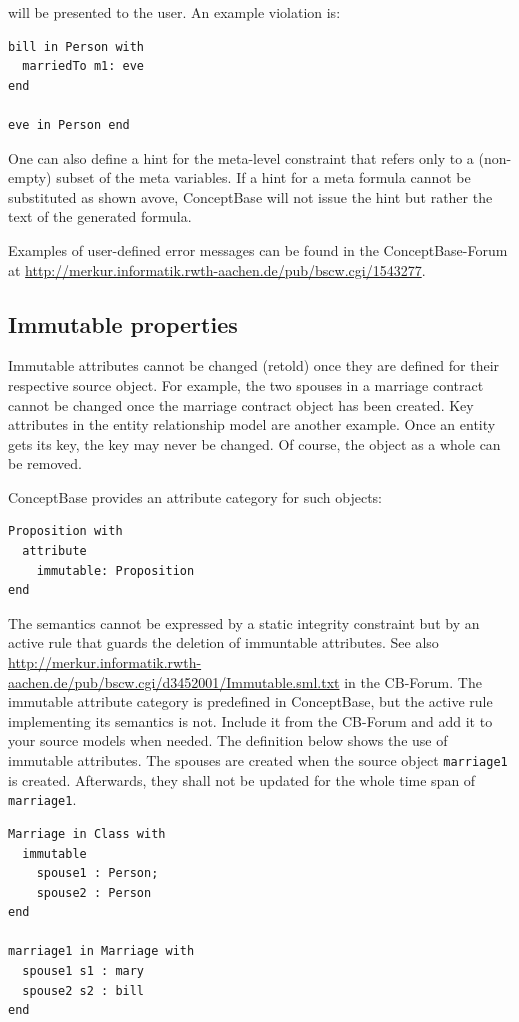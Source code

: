 will be presented to the user. An example violation is:

{\small
\begin{verbatim}
bill in Person with
  marriedTo m1: eve
end

eve in Person end
\end{verbatim}
}

One can also define a hint for the meta-level constraint that
refers only to a (non-empty) subset of the meta variables.
If a hint for a meta formula cannot be substituted as shown avove,
ConceptBase will not issue the hint but rather the text of the generated
formula.

Examples of user-defined error messages can be found in the ConceptBase-Forum at
\url{http://merkur.informatik.rwth-aachen.de/pub/bscw.cgi/1543277}.


\subsection{Immutable properties}
\label{sec:Immutable}

Immutable attributes cannot be changed (retold) once they are
defined for their respective source object. For example, the two spouses in a marriage
contract cannot be changed once the marriage contract object has been created.
Key attributes in the entity relationship model are another example. Once an
entity gets its key, the key may never be changed. Of course, the object as a whole
can be removed.

ConceptBase provides an attribute category for such objects:

{\small
\begin{verbatim}
Proposition with
  attribute
    immutable: Proposition
end
\end{verbatim}
}


The semantics cannot be expressed by a static integrity constraint but by an active rule
that guards the deletion of immuntable attributes. See also
\url{http://merkur.informatik.rwth-aachen.de/pub/bscw.cgi/d3452001/Immutable.sml.txt}
in the CB-Forum. The immutable attribute category is predefined in ConceptBase,
but the active rule implementing its semantics is not. Include it from the CB-Forum
and add it to your source models when needed. The definition below shows the use of
immutable attributes. The spouses are created when the source
object {\tt marriage1} is created. Afterwards, they shall not be updated for the whole
time span of {\tt marriage1}.

{\small
\begin{verbatim}
Marriage in Class with  
  immutable
    spouse1 : Person;
    spouse2 : Person
end 

marriage1 in Marriage with  
  spouse1 s1 : mary
  spouse2 s2 : bill
end 
\end{verbatim}
}


